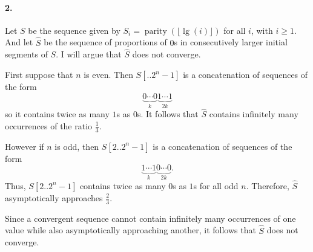 \documentclass[
]{article}
\DeclareMathOperator{\parity}{parity}
\begin{document}
\paragraph{2.} Let $S$ be the sequence given by $S_i = \parity(\lfloor\lg(i)\rfloor)$ for all $i$, with $i\geq 1$.  And let $\hat S$ be the sequence of proportions of $0$s in consecutively larger initial segments of $S$.  I will argue that $\hat S$ does not converge.

First suppose that $n$ is even.  Then $S[..2^{n}-1]$ is a concatenation of sequences of the form
\[\underbrace{0\cdots 0}_{k}\underbrace{1\cdots 1}_{2k}
\]
so it contains twice as many $1$s as $0$s.  It follows that $\hat S$ contains infinitely many occurrences of the ratio $\frac{1}{3}$.




However if $n$ is odd, then $S[2..2^{n}-1]$ is a concatenation of sequences of the form 
\[\underbrace{1\cdots 1}_{k}\underbrace{0\cdots 0}_{2k}.
\]
Thus, $S[2..2^{n}-1]$ contains twice as many $0$s as $1$s for all odd $n$.  Therefore, $\hat S$ asymptotically approaches $\frac{2}{3}$.

Since a convergent sequence cannot contain infinitely many occurrences of one value while also asymptotically approaching another, it follows that $\hat S$ does not converge.


\end{document}

